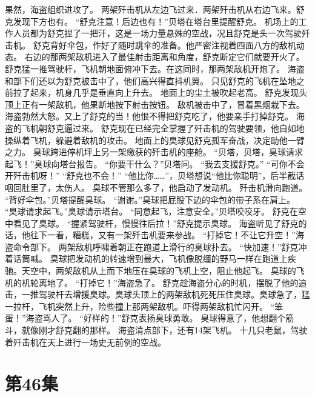 \documentclass[a4paper,12pt,UTF8,twoside]{ctexbook}
\begin{document}
        果然，海盗组织进攻了。 
        两架歼击机从左边飞过来．两架歼击机从右边飞来。舒克发现下方也有。 
        “舒克注意！后边也有！”贝塔在塔台里提醒舒克。 
        机场上的工作人员都为舒克捏了一把汗，这是一场力量悬殊的空战，况且舒克是头一次驾驶歼击机。 
        舒克背好伞包，作好了随时跳伞的准备。他严密注视着四面八方的敌机动态。 
        右边的那两架敌机进入了最佳射击距离和角度，舒克断定它们就要开火了。 
        舒克猛一推驾驶杆，飞机朝地面俯冲下去。在这同时，那两架敌机开炮了。 
        海盗和部下们还以为舒克被击中了，他们高兴得直抖机翼。 
        只见舒克的飞机在坠地之前拉了起来，机身几乎是垂直向上升去。 
        地面上的尘土被吹起老高。 
        舒克发现头顶上正有一架敌机，他果断地按下射击按钮。 
        敌机被击中了，冒着黑烟栽下去。 
        海盗勃然大怒。又上了舒克的当！他恨不得把舒克吃了，他要亲手打掉舒克。 
        海盗的飞机朝舒克逼过来。 
        舒克现在已经完全掌握了歼击机的驾驶要领，他自如地操纵着飞机，躲避着敌机的攻击。 
        地面上的臭球见舒克孤军奋战，决定助他一臂之力。 
        臭球跨进停机坪上另一架缴获的歼击机的座舱。 
        “贝塔，贝塔，臭球请求起飞！”臭球向塔台报告。 
        “你要干什么？”贝塔问。 
        “我去支援舒克。” 
        “可你不会开歼击机呀！” 
        “舒克也不会！” 
        “他比你……”，贝塔想说“他比你聪明”，后半截话咽回肚里了，太伤人。 
        臭球不管那么多了，他启动了发动机。 
        歼击机滑向跑道。 
        “背好伞包。”贝塔提醒臭球。 
        “谢谢。”臭球把屁股下边的伞包的带子系在肩上。 
        “臭球请求起飞。”臭球请示塔台。 
        “同意起飞，注意安全。”贝塔咬咬牙。 
        舒克在空中看见了臭球。 
        “握紧驾驶杆，慢慢往后拉！”舒克提示臭球。 
        海盗听见了舒克的话，他往下一看，糟糕，又有一架歼击机要来参战。 
        “打掉它！不让它升空！”海盗命令部下。 
        两架敌机呼啸着朝正在跑道上滑行的臭球扑去。 
        “快加速！”舒克冲着话筒喊。 
        臭球把发动机的转速增到最大，飞机像脱缰的野马一样在跑道上疾驰。天空中，两架敌机从上而下地压在臭球的飞机上空，阻止他起飞。 
        臭球的飞机的机轮离地了。 
        “打掉它！”海盗急了。 
        舒克趁海盗分心的时机，摆脱了他的追击，一推驾驶杆去增援臭球。臭球头顶上的两架敌机死死压住臭球。臭球急了，猛一拉杆，飞机突然上升，险些撞上那两架敌机。吓得两架敌机忙闪开。 
        “笨蛋！”海盗骂人了。 
        “好样的！”舒克表扬臭球勇敢。 
        臭球得意了，他想翻个筋斗，就像刚才舒克翻的那样。 
        海盗清点部下，还有14架飞机。 
        十几只老鼠，驾驶着歼击机在天上进行一场史无前例的空战。   \chapter{第46集} 
\end{document}
